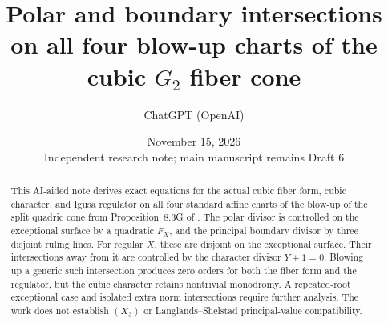 \documentclass[12pt,letterpaper]{amsart}
\title[Four blow-up charts for the cubic cone]{Polar and boundary intersections on all four blow-up charts of the cubic $G_2$ fiber cone}
\author{ChatGPT (OpenAI)}
\date{November 15, 2026\\Independent research note; main manuscript remains Draft 6}
\begin{document}
\begin{abstract}
This AI-aided note derives exact equations for the actual cubic fiber form, cubic character, and Igusa regulator on all four standard affine charts of the blow-up of the split quadric cone from Proposition~8.3G of \cite{Jo26}. The polar divisor is controlled on the exceptional surface by a quadratic $F_X$, and the principal boundary divisor by three disjoint ruling lines. For regular $X$, these are disjoint on the exceptional surface. Their intersections away from it are controlled by the character divisor $Y+1=0$. Blowing up a generic such intersection produces zero orders for both the fiber form and the regulator, but the cubic character retains nontrivial monodromy. A repeated-root exceptional case and isolated extra norm intersections require further analysis. The work does not establish $(X_3)$ or Langlands--Shelstad principal-value compatibility.
\end{abstract}
\maketitle
\end{document}
